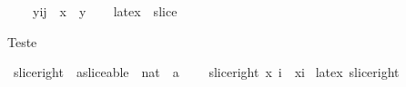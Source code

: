 \begin{isabellebody}
\ \ \ \ {\isacharparenleft}y{\isasymdagger}i{\isachardot}{\isachardot}j{\isacharparenright}{\isacharparenright}\ {\isasymlongleftrightarrow}\ {\isacharparenleft}x\ {\isacharequal}\ y{\isacharparenright}{\isachardoublequoteclose}\isanewline
\ \ \isanewline
{}\isamarkupfalse%
\ {\isacharparenleft}latex\ \ slice\ \ {\isacharparenleft}{\isachardoublequoteopen}{\isacharparenleft}{}{\isacharunderscore}\isactrlbsub {\isacharbrackleft}{\isacharunderscore}{\isachardot}{\isachardot}{\isacharunderscore}{\isacharbrackright}\isactrlesub {\isacharparenright}{\isachardoublequoteclose}\ {\isacharbrackleft}{}{}{\isacharcomma}{}{}{\isacharcomma}{}{}{\isacharbrackright}\ {}{}{\isacharparenright}%
\begin{isamarkuptext}%
Teste %
\end{isamarkuptext}\isamarkuptrue%
\isamarkupfalse%
\ slice{\isacharunderscore}right\ {\isacharcolon}{\isacharcolon}\ {\isachardoublequoteopen}{\isacharprime}a{\isacharcolon}{\isacharcolon}sliceable\ {\isasymRightarrow}\ nat\ {\isasymRightarrow}\ {\isacharprime}a{\isachardoublequoteclose}\ {\isacharparenleft}{\isachardoublequoteopen}{\isacharparenleft}{}{\isacharunderscore}{\isasymdagger}{\isachardot}{\isachardot}{\isacharunderscore}{\isacharparenright}{\isachardoublequoteclose}\ {\isacharbrackleft}{}{}{\isacharcomma}{}{}{\isacharbrackright}\ {}{}{\isacharparenright}\isanewline
{}\ {\isachardoublequoteopen}slice{\isacharunderscore}right\ x\ i\ {\isacharequal}\ x{\isasymdagger}{}{\isachardot}{\isachardot}i{\isachardoublequoteclose}\isanewline
\isanewline
{}\isamarkupfalse%
\ {\isacharparenleft}{\isachardoublequoteopen}latex{\isachardoublequoteclose}{\isacharparenright}\ slice{\isacharunderscore}right\ \ {\isacharparenleft}{\isachardoublequoteopen}{\isacharparenleft}{}{\isacharunderscore}\isactrlbsub {\isacharbrackleft}{\isachardot}{\isachardot}{\isacharunderscore}{\isacharbrackright}\isactrlesub {\isacharparenright}{\isachardoublequoteclose}\ {\isacharbrackleft}{}{}{\isacharcomma}{}{}{\isacharbrackright}\ {}{}{\isacharparenright}\isanewline
\isanewline
\isanewline
\isanewline
{}\isamarkupfalse%

\end{isabellebody}
